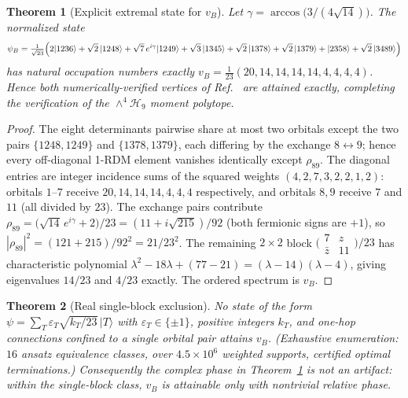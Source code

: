 \documentclass[11pt]{article}
\newtheorem{theorem}{Theorem}
\newcommand{\ket}[1]{|#1\rangle}
\begin{document}
\begin{theorem}[Explicit extremal state for $v_B$]
\label{thm:psiB}
Let $\gamma = \arccos\bigl(3/(4\sqrt{14})\bigr)$. The normalized state
\begin{equation}
\label{eq:psiB}
\psi_B = \tfrac{1}{\sqrt{23}}\Bigl(
2\ket{1236} + \sqrt2\,\ket{1248} + \sqrt7\,e^{i\gamma}\ket{1249}
+ \sqrt3\,\ket{1345} + \sqrt2\,\ket{1378} + \sqrt2\,\ket{1379}
+ \ket{2358} + \sqrt2\,\ket{3489}\Bigr)
\end{equation}
has natural occupation numbers exactly $v_B = \tfrac1{23}(20,14,14,14,14,4,4,4,4)$.
Hence both numerically-verified vertices of Ref.~\cite{AK2008} are attained
exactly, completing the verification of the $\wedge^4\mathcal{H}_9$ moment
polytope.
\end{theorem}

\begin{proof}
The eight determinants pairwise share at most two orbitals except the two
pairs $\{1248,1249\}$ and $\{1378,1379\}$, each differing by the exchange
$8 \leftrightarrow 9$; hence every off-diagonal 1-RDM element vanishes
identically except $\rho_{89}$. The diagonal entries are integer incidence
sums of the squared weights $(4,2,7,3,2,2,1,2)$: orbitals $1$--$7$ receive
$20,14,14,14,4,4,4$ respectively, and orbitals $8,9$ receive $7$ and $11$
(all divided by $23$). The exchange pairs contribute
$\rho_{89} = \bigl(\sqrt{14}\,e^{i\gamma} + 2\bigr)/23
= (11 + i\sqrt{215})/92$ (both fermionic signs are $+1$), so
$|\rho_{89}|^2 = (121+215)/92^2 = 21/23^2$. The remaining $2\times2$ block
$\bigl(\begin{smallmatrix} 7 & z \\ \bar z & 11\end{smallmatrix}\bigr)/23$
has characteristic polynomial $\lambda^2 - 18\lambda + (77 - 21)
= (\lambda-14)(\lambda-4)$, giving eigenvalues $14/23$ and $4/23$ exactly.
The ordered spectrum is $v_B$.
\end{proof}

\begin{theorem}[Real single-block exclusion]
\label{thm:realexclusion}
No state of the form $\psi = \sum_T \varepsilon_T\sqrt{k_T/23}\,\ket{T}$
with $\varepsilon_T \in \{\pm1\}$, positive integers $k_T$, and one-hop
connections confined to a single orbital pair attains $v_B$. (Exhaustive
enumeration: $16$ ansatz equivalence classes, over $4.5\times10^6$
weighted supports, certified optimal terminations.) Consequently the
complex phase in Theorem~\ref{thm:psiB} is not an artifact: within the
single-block class, $v_B$ is attainable only with nontrivial relative phase.
\end{theorem}
\end{document}
